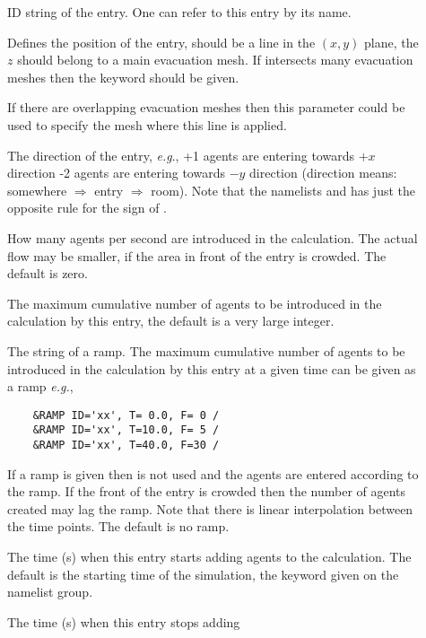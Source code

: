 \documentclass[12pt,a4paper,final,twoside]{stylevk}
\begin{document}
\begin{description}
%
\item[] ID string of the entry.  One can refer to this entry
  by its name.
%
\item[] Defines the position of the entry, should be a line
  in the $(x,y)$ plane, the $z$ should belong to a main evacuation
  mesh.  If  intersects many evacuation meshes then the
  keyword  should be given.
%
\item[] If there are overlapping evacuation meshes
  then this parameter could be used to specify the mesh where this
   line is applied.
%
\item[] The direction of the entry, \emph{e.g}., +1 agents
  are entering towards $+x$ direction -2 agents are entering towards
  $-y$ direction (direction means: somewhere $\Rightarrow$ entry
  $\Rightarrow$ room).  Note that the namelists  and
   has just the opposite rule for the sign of .
%
\item[] How many agents per second are introduced in
  the calculation. The actual flow may be smaller, if the area in
  front of the entry is crowded.  The default is zero.
%
\item[] The maximum cumulative number of agents to
  be introduced in the calculation by this entry, the default is a
  very large integer.
%
\item[] The  string of a ramp.  The
  maximum cumulative number of agents to be introduced in the
  calculation by this entry at a given time can be given as a ramp
  \emph{e.g.}, 
\begin{verbatim}
    &RAMP ID='xx', T= 0.0, F= 0 /
    &RAMP ID='xx', T=10.0, F= 5 /
    &RAMP ID='xx', T=40.0, F=30 /
\end{verbatim}
  If a ramp is given then  is not used and the agents
  are entered according to the ramp.  If the front of the entry is
  crowded then the number of agents created may lag the ramp.
  Note that there is linear interpolation between the time points.
  The default is no ramp.
%
\item[] The time (s) when this entry starts adding
  agents to the calculation.  The default is the starting time of the
  simulation, the  keyword given on the  
  namelist group.
%
\item[] The time (s) when this entry stops adding

\end{description}
\end{document}
